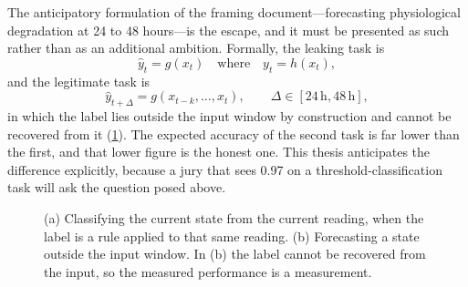\documentclass[12pt,a4paper,oneside]{report}
\begin{document}
The anticipatory formulation of the framing document---forecasting physiological degradation at 24 to 48 hours---is the escape, and it must be presented as such rather than as an additional ambition. Formally, the leaking task is
\begin{equation}
  \hat{y}_t = g(x_t) \quad\text{where}\quad y_t = h(x_t),
\end{equation}
and the legitimate task is
\begin{equation}
  \hat{y}_{t+\Delta} = g(x_{t-k}, \dots, x_t), \qquad \Delta \in [24\,\text{h}, 48\,\text{h}],
\end{equation}
in which the label lies outside the input window by construction and cannot be recovered from it (\cref{fig:leak-vs-forecast}). The expected accuracy of the second task is far lower than the first, and that lower figure is the honest one. This thesis anticipates the difference explicitly, because a jury that sees 0.97 on a threshold-classification task will ask the question posed above.

\begin{figure}[htbp]
\centering
{}
\caption{(a) Classifying the current state from the current reading, when the label is a rule applied to that same reading. (b) Forecasting a state outside the input window. In (b) the label cannot be recovered from the input, so the measured performance is a measurement.}\label{fig:leak-vs-forecast}
\end{figure}
\end{document}
